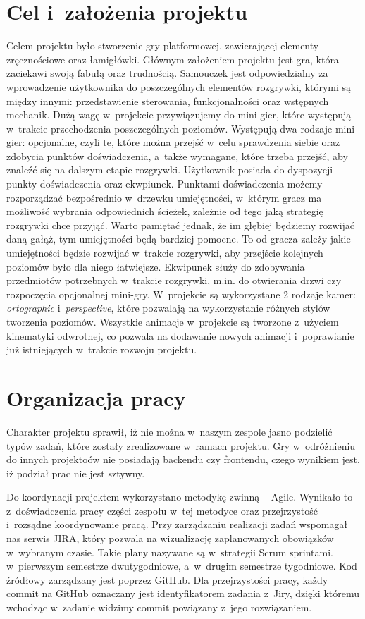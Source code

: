 \documentclass[oneside,polski,logo]{amuthesis}
\begin{document}
\section{Cel i~założenia projektu}
Celem projektu było stworzenie gry platformowej, zawierającej elementy zręcznościowe oraz łamigłówki. Głównym założeniem projektu jest gra, która zaciekawi swoją fabułą oraz trudnością. Samouczek jest odpowiedzialny za wprowadzenie użytkownika do poszczególnych elementów rozgrywki, którymi są między innymi: przedstawienie sterowania, funkcjonalności oraz wstępnych mechanik. Dużą wagę w~projekcie przywiązujemy do mini-gier, które występują w~trakcie przechodzenia poszczególnych poziomów. Występują dwa rodzaje mini-gier: opcjonalne, czyli te, które można przejść w~celu sprawdzenia siebie oraz zdobycia punktów doświadczenia, a~także wymagane, które trzeba przejść, aby znaleźć się na dalszym etapie rozgrywki. Użytkownik posiada do dyspozycji punkty doświadczenia oraz ekwpiunek. Punktami doświadczenia możemy rozporządzać bezpośrednio w~drzewku umiejętności, w~którym gracz ma możliwość wybrania odpowiednich ścieżek, zależnie od tego jaką strategię rozgrywki chce przyjąć. Warto pamiętać jednak, że im głębiej będziemy rozwijać daną gałąż, tym umiejętności będą bardziej pomocne. To od gracza zależy jakie umiejętności będzie rozwijać w~trakcie rozgrywki, aby przejście kolejnych poziomów było dla niego łatwiejsze. Ekwipunek służy do zdobywania przedmiotów potrzebnych w~trakcie rozgrywki, m.in. do otwierania drzwi czy rozpoczęcia opcjonalnej mini-gry. W~projekcie są wykorzystane 2 rodzaje kamer: \emph{ortographic} i~\emph{perspective}, które pozwalają na wykorzystanie różnych stylów tworzenia poziomów. Wszystkie animacje w~projekcie są tworzone z~użyciem kinematyki odwrotnej, co pozwala na dodawanie nowych animacji i~poprawianie już istniejących w~trakcie rozwoju projektu.
\section{Organizacja pracy}
Charakter projektu sprawił, iż nie można w~naszym zespole jasno podzielić typów zadań, które zostały zrealizowane w~ramach projektu. Gry w~odróżnieniu do innych projektoów nie posiadają backendu czy frontendu, czego wynikiem jest, iż podział prac nie jest sztywny. 

Do koordynacji projektem wykorzystano metodykę zwinną – Agile. Wynikało to z~doświadczenia pracy części zespołu w~tej metodyce oraz przejrzystość i~rozsądne koordynowanie pracą. Przy zarządzaniu realizacji zadań wspomagał nas serwis JIRA, który pozwala na wizualizację zaplanowanych obowiązków w~wybranym czasie. Takie plany nazywane są w~strategii Scrum sprintami.\\ w~pierwszym semestrze dwutygodniowe, a~w~drugim semestrze tygodniowe. Kod źródłowy zarządzany jest poprzez GitHub. Dla przejrzystości pracy, każdy commit na GitHub oznaczany jest identyfikatorem zadania z~Jiry, dzięki któremu wchodząc w~zadanie widzimy commit powiązany z~jego rozwiązaniem. 
\end{document}
